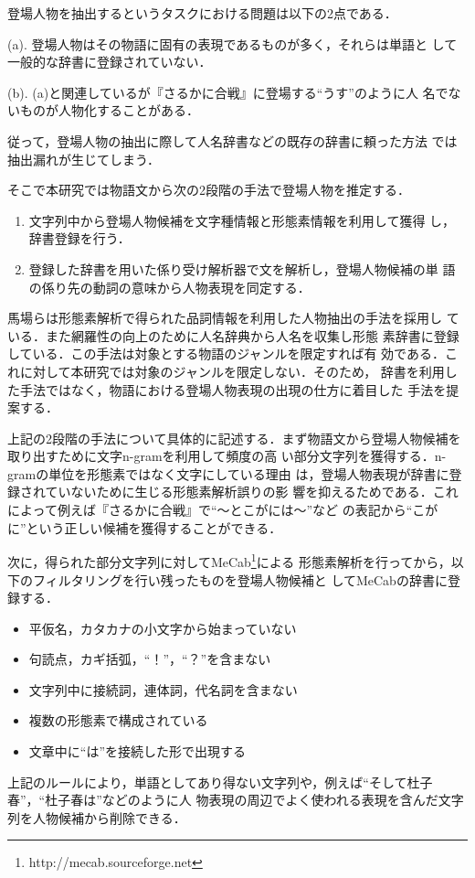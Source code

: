 \documentclass[japanese]{jnlp_1.4}
\begin{document}
  登場人物を抽出するというタスクにおける問題は以下の2点である．
  \begin{list}{}{}
   \item[(a).] 登場人物はその物語に固有の表現であるものが多く，それらは単語と
	 して一般的な辞書に登録されていない．
   \item[(b).] (a)と関連しているが『さるかに合戦』に登場する``うす''のように人
	 名でないものが人物化することがある．
  \end{list}
  従って，登場人物の抽出に際して人名辞書などの既存の辞書に頼った方法
  では抽出漏れが生じてしまう．

  そこで本研究では物語文から次の2段階の手法で登場人物を推定する．
  \begin{enumerate}
   \item 文字列中から登場人物候補を文字種情報と形態素情報を利用して獲得
	 し，辞書登録を行う．
   \item 登録した辞書を用いた係り受け解析器で文を解析し，登場人物候補の単
	 語の係り先の動詞の意味から人物表現を同定する．
  \end{enumerate}

  
  馬場ら\cite{baba2007}は形態素解析で得られた品詞情報を利用した人物抽出の手法を採用し
  ている．また網羅性の向上のために人名辞典から人名を収集し形態
  素辞書に登録している．この手法は対象とする物語のジャンルを限定すれば有
  効である．これに対して本研究では対象のジャンルを限定しない．そのため，
  辞書を利用した手法ではなく，物語における登場人物表現の出現の仕方に着目した
  手法を提案する．

  上記の2段階の手法について具体的に記述する．まず物語文から登場人物候補を取り出すために文字n-gramを利用して頻度の高
  い部分文字列を獲得する．n-gramの単位を形態素ではなく文字にしている理由
  は，登場人物表現が辞書に登録されていないために生じる形態素解析誤りの影
  響を抑えるためである．これによって例えば『さるかに合戦』で``〜とこがには〜''など
  の表記から``こがに''という正しい候補を獲得することができる．

  次に，得られた部分文字列に対してMeCab\footnote{http://mecab.sourceforge.net}による
  形態素解析を行ってから，以下のフィルタリングを行い残ったものを登場人物候補と
  してMeCabの辞書に登録する．
  \begin{itemize}
   \item 平仮名，カタカナの小文字から始まっていない
   \item 句読点，カギ括弧，``！''，``？''を含まない
   \item 文字列中に接続詞，連体詞，代名詞を含まない
   \item 複数の形態素で構成されている
   \item 文章中に``は''を接続した形で出現する
  \end{itemize}
  上記のルールにより，単語としてあり得ない文字列や，例えば``そして杜子春''，``杜子春は''などのように人
  物表現の周辺でよく使われる表現を含んだ文字列を人物候補から削除できる．
\end{document}
